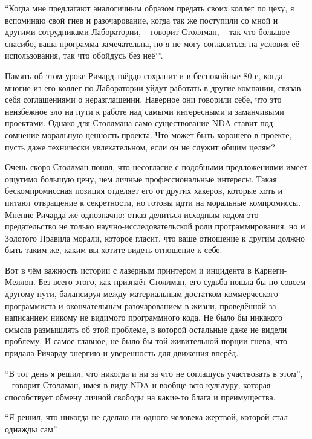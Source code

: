 ``Когда мне предлагают аналогичным образом предать своих коллег по цеху, я вспоминаю свой гнев и разочарование, когда так же поступили со мной и другими сотрудниками Лаборатории, -- говорит Столлман, -- так что большое спасибо, ваша программа замечательна, но я не могу согласиться на условия её использования, так что обойдусь без неё'\hspace{0.01in}''.

Память об этом уроке Ричард твёрдо сохранит и в беспокойные 80-е, когда многие из его коллег по Лаборатории уйдут работать в другие компании, связав себя соглашениями о неразглашении. Наверное они говорили себе, что это неизбежное зло на пути к работе над самыми интересными и заманчивыми проектами. Однако для Столлмана само существование NDA ставит под сомнение моральную ценность проекта. Что может быть хорошего в проекте, пусть даже технически увлекательном, если он не служит общим целям?

Очень скоро Столлман понял, что несогласие с подобными предложениями имеет ощутимо большую цену, чем личные профессиональные интересы. Такая бескомпромиссная позиция отделяет его от других хакеров, которые хоть и питают отвращение к секретности, но готовы идти на моральные компромиссы. Мнение Ричарда же однозначно: отказ делиться исходным кодом это предательство не только научно-исследовательской роли программирования, но и Золотого Правила морали, которое гласит, что ваше отношение к другим должно быть таким же, каким вы хотите видеть отношение к себе.

Вот в чём важность истории с лазерным принтером и инцидента в Карнеги-Меллон. Без всего этого, как признаёт Столлман, его судьба пошла бы по совсем другому пути, балансируя между материальным достатком коммерческого программиста и окончательным разочарованием в жизни, проведённой за написанием никому не видимого программного кода. Не было бы никакого смысла размышлять об этой проблеме, в которой остальные даже не видели проблему. И самое главное, не было бы той живительной порции гнева, что придала Ричарду энергию и уверенность для движения вперёд.

``В тот день я решил, что никогда и ни за что не соглашусь участвовать в этом'', -- говорит Столлман, имея в виду NDA и вообще всю культуру, которая способствует обмену личной свободы на какие-то блага и преимущества.

``Я решил, что никогда не сделаю ни одного человека жертвой, которой стал однажды сам''.

\theendnotes
\setcounter{endnote}{0}
